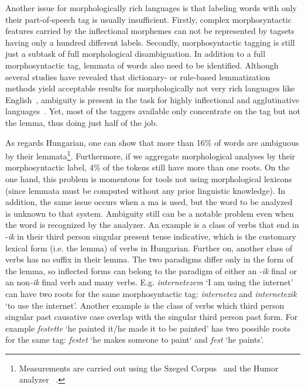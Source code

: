 Another issue for morphologically rich languages is that labeling words with only their part-of-speech tag is usually insufficient. 
Firstly, complex morphosyntactic features carried by the inflectional morphemes can not be represented by tagsets having only a hundred different labels. 
Secondly, morphosyntactic tagging is still just a subtask of full morphological disambiguation. 
In addition to a full morphosyntactic tag, lemmata of words also need to be identified. Although several studies have revealed that dictionary- or rule-based lemmatization methods yield acceptable results for morphologically not very rich languages like English~\cite{Porter1980,Plisson2004}, ambiguity is present in the task for highly inflectional and agglutinative languages~\cite{Jursic2007,Sak2007,Chrupaa2008}. 
Yet, most of the taggers available only concentrate on the tag but not the lemma, thus doing just half of the job.

As regards Hungarian, one can show that more than 16\% of words are ambiguous by their lemmata\footnote{Measurements are carried out using the  Szeged Corpus~\cite{Csendes2004} and the Humor analyzer ~\cite{Proszeky1994,Novak2003,Proszeky2005}.}. 
Furthermore, if we aggregate morphological analyses by their morphosyntactic label, 4\% of the tokens still have more than one roots. 
On the one hand, this problem is momentous for tools not using morphological lexicons (since lemmata must be computed without any prior linguistic knowledge). 
In addition, the same issue occurs when a \acrshort{ma} is used, but the word to be analyzed is unknown to that system.
Ambiguity still can be a notable problem even when the word is recognized by the analyzer.
An example is a class of verbs that end in -\emph{ik} in their third person singular present tense indicative, which is the customary lexical form (i.e. the lemma) of verbs in Hungarian. Further on, another class of verbs has no suffix in their lemma. 
The two paradigms differ only in the form of the lemma, so inflected forms can belong to the paradigm of either an \emph{-ik} final or an non\emph{-ik} final verb and many verbs. 
E.g. \emph{internetezem} `I am using the internet' can have two roots for the same morphosyntactic tag: \emph{internetez} and \emph{internetezik} `to use the internet'.
Another example is the class of verbs which third person singular past causative case overlap with the singular third person past form. 
For example \emph{festette} `he painted it/he made it to be painted' has two possible roots for the same tag: \emph{festet} `he makes someone to paint` and \emph{fest} `he paints'.  %

